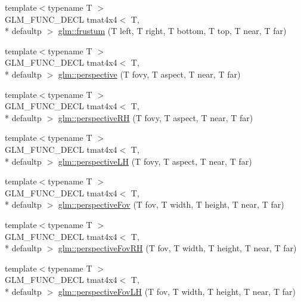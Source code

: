 \begin{DoxyCompactItemize}
\item 
{\footnotesize template$<$typename T $>$ }\\G\-L\-M\-\_\-\-F\-U\-N\-C\-\_\-\-D\-E\-C\-L tmat4x4$<$ T, \\*
defaultp $>$ \hyperlink{group__gtc__matrix__transform_gada6deb989d4b553fe0f7e3279f3afae1}{glm\-::frustum} (T left, T right, T bottom, T top, T near, T far)
\item 
{\footnotesize template$<$typename T $>$ }\\G\-L\-M\-\_\-\-F\-U\-N\-C\-\_\-\-D\-E\-C\-L tmat4x4$<$ T, \\*
defaultp $>$ \hyperlink{group__gtc__matrix__transform_gac3613dcb6c6916465ad5b7ad5a786175}{glm\-::perspective} (T fovy, T aspect, T near, T far)
\item 
{\footnotesize template$<$typename T $>$ }\\G\-L\-M\-\_\-\-F\-U\-N\-C\-\_\-\-D\-E\-C\-L tmat4x4$<$ T, \\*
defaultp $>$ \hyperlink{group__gtc__matrix__transform_ga5a4fa9f8ffabb2294e48a18bf8fa2f5f}{glm\-::perspective\-R\-H} (T fovy, T aspect, T near, T far)
\item 
{\footnotesize template$<$typename T $>$ }\\G\-L\-M\-\_\-\-F\-U\-N\-C\-\_\-\-D\-E\-C\-L tmat4x4$<$ T, \\*
defaultp $>$ \hyperlink{group__gtc__matrix__transform_ga34048da27c559f1ac8e9550d169dd6f3}{glm\-::perspective\-L\-H} (T fovy, T aspect, T near, T far)
\item 
{\footnotesize template$<$typename T $>$ }\\G\-L\-M\-\_\-\-F\-U\-N\-C\-\_\-\-D\-E\-C\-L tmat4x4$<$ T, \\*
defaultp $>$ \hyperlink{group__gtc__matrix__transform_gae9146e2c550fc8646299e4b900238145}{glm\-::perspective\-Fov} (T fov, T width, T height, T near, T far)
\item 
{\footnotesize template$<$typename T $>$ }\\G\-L\-M\-\_\-\-F\-U\-N\-C\-\_\-\-D\-E\-C\-L tmat4x4$<$ T, \\*
defaultp $>$ \hyperlink{group__gtc__matrix__transform_ga07cd8df791bf90dcb782645fe0b21261}{glm\-::perspective\-Fov\-R\-H} (T fov, T width, T height, T near, T far)
\item 
{\footnotesize template$<$typename T $>$ }\\G\-L\-M\-\_\-\-F\-U\-N\-C\-\_\-\-D\-E\-C\-L tmat4x4$<$ T, \\*
defaultp $>$ \hyperlink{group__gtc__matrix__transform_gae705a2f19c3ef5ef880bd6c92759cf2d}{glm\-::perspective\-Fov\-L\-H} (T fov, T width, T height, T near, T far)

\end{DoxyCompactItemize}
